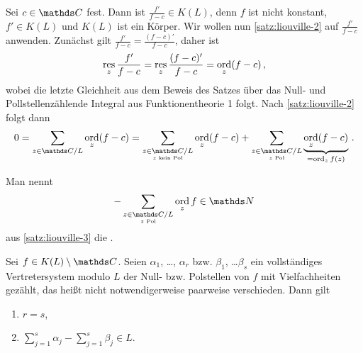 \begin{bewe}
Sei $c\in\CC$ fest.
Dann ist $\frac{f'}{f-c} \in K(L)$, denn $f$ ist nicht konstant, $f'\in K(L)$ und $K(L)$ ist ein Körper.
Wir wollen nun \autoref{satz:liouville-2} auf $\frac{f'}{f-c}$ anwenden.
Zunächst gilt $\frac{f'}{f-c} = \frac{(f-c)'}{f-c}$, daher ist
\[
	\operatorname*{res}_z \frac{f'}{f-c}
	= \operatorname*{res}_z \frac{(f-c)'}{f-c}
	= \operatorname*{ord}_z (f-c)
	\,,
\]
wobei die letzte Gleichheit aus dem Beweis des Satzes über das Null- und Pollstellenzählende Integral aus Funktionentheorie 1 folgt.
Nach \autoref{satz:liouville-2} folgt dann
\[
	0
	= \sum_{z\in\CC/L} \ord_z (f-c)
	= \sum_{\substack{z\in\CC/L\\ \scriptscriptstyle z \text{ kein Pol}}} \ord_z (f-c)
	+ \sum_{\substack{z\in\CC/L\\ \scriptscriptstyle z \text{ Pol}}} \underbrace{\ord_z (f-c)}_{=\ord_z f(z)}
	\,.
\]
\end{bewe}

\begin{defi}
Man nennt
\[
	-\sum_{\substack{z\in\CC/L\\ \scriptscriptstyle z \text{ Pol}}} \ord_z f \in \NN
\]
aus \autoref{satz:liouville-3} die .
\end{defi}

\begin{satz}\label{satz:liouville-4}
Sei $f\in K(L)\setminus\CC$.
Seien $\alpha_1$, \ldots, $\alpha_r$ bzw. $\beta_1$, \ldots $\beta_s$ ein vollständiges Vertretersystem modulo $L$ der Null- bzw. Polstellen von $f$ mit Vielfachheiten gezählt, das heißt nicht notwendigerweise paarweise verschieden.
Dann gilt
\begin{enumerate}
\item $r = s$,
\item $\sum_{j=1}^s \alpha_j - \sum_{j=1}^s \beta_j \in L$.
\end{enumerate}
\end{satz}

